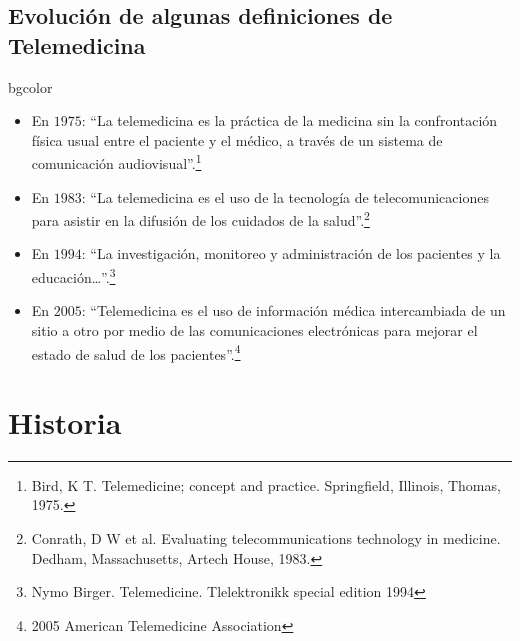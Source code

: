 \documentclass[xcolor=svgnames]{beamer}
\begin{document}
\subsection[Evolución Mundial]{Evolución de algunas definiciones de Telemedicina}
\begin{frame}
\begin{beamercolorbox}[rounded=true, center, shadow=true]{bgcolor}
  \begin{itemize}
   \item En $1975$: ``La telemedicina es la práctica de la medicina sin la confrontación física usual entre el paciente y el médico, a través de un sistema de comunicación audiovisual''.\footnote{Bird, K T. Telemedicine; concept and practice. Springfield, Illinois, Thomas, 1975.} \pause
   \item En $1983$: ``La telemedicina es el uso de la tecnología de telecomunicaciones para asistir en la difusión de los cuidados de la salud''.\footnote{Conrath, D W et al. Evaluating telecommunications technology in medicine. Dedham, Massachusetts, Artech House, 1983.} \pause
   \item En $1994$: ``La investigación, monitoreo y administración de los pacientes y la educación…''.\footnote{Nymo Birger. Telemedicine. Tlelektronikk special edition 1994} \pause
   \item En $2005$: ``Telemedicina es el uso de información médica intercambiada de un sitio a otro por medio de las comunicaciones electrónicas para mejorar el estado de salud de los pacientes''.\footnote{2005 American Telemedicine Association}
  \end{itemize}
\end{beamercolorbox}
\end{frame}

\section{Historia}
\end{document}
